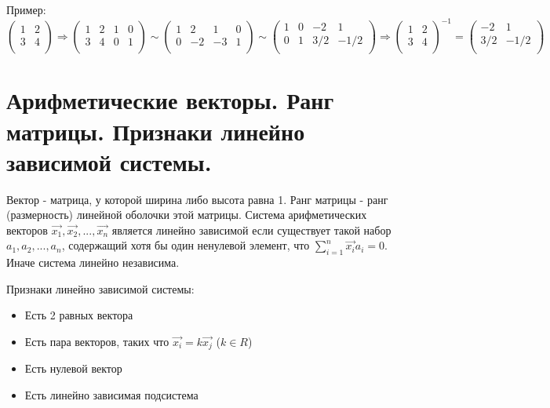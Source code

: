 \documentclass[12pt]{article}
\begin{document}
\begin{sloppypar}
    Пример:
    \[
        \begin{pmatrix}
            1 & 2 \\
            3 & 4 \\
        \end{pmatrix}
        \Rightarrow
        \left(\begin{array}{ll|ll}
                1 & 2 & 1 & 0 \\
                3 & 4 & 0 & 1 \\
            \end{array}\right)
        \sim
        \left(\begin{array}{rr|rr}
                1 & 2  & 1  & 0 \\
                0 & -2 & -3 & 1 \\
            \end{array}\right)
        \sim
        \left(\begin{array}{rr|rr}
                1 & 0 & -2  & 1    \\
                0 & 1 & 3/2 & -1/2 \\
            \end{array}\right)
        \Rightarrow
        \begin{pmatrix}
            1 & 2 \\
            3 & 4 \\
        \end{pmatrix}^{-1}
        =
        \begin{pmatrix}
            -2  & 1    \\
            3/2 & -1/2 \\
        \end{pmatrix}
    \]

    \section{Арифметические векторы. Ранг матрицы. Признаки линейно зависимой системы.}
    Вектор - матрица, у которой ширина либо высота равна 1. Ранг матрицы - ранг (размерность) линейной оболочки этой матрицы. Система арифметических векторов $\Vec{x_1}, \Vec{x_2}, ..., \Vec{x_n}$ является линейно зависимой если существует такой набор $a_1, a_2, ..., a_n$, содержащий хотя бы один ненулевой элемент, что $\sum_{i = 1}^n \Vec{x_i}a_i = 0$. Иначе система линейно независима.

    Признаки линейно зависимой системы:
    \begin{itemize}
        \item Есть 2 равных вектора
        \item Есть пара векторов, таких что $\Vec{x_i} = k\Vec{x_j}$ ($k \in R$)
        \item Есть нулевой вектор
        \item Есть линейно зависимая подсистема
    \end{itemize}


\end{sloppypar}
\end{document}
